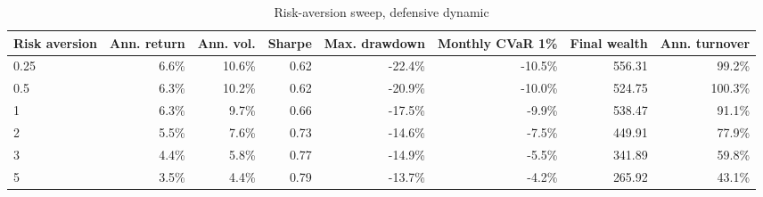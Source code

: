 ﻿\begin{table}[!htbp]
\centering
\caption{Risk-aversion sweep, defensive dynamic}
\label{tab:allocation-risk-aversion-defensive}
\small
\setlength{\tabcolsep}{5pt}
\renewcommand{\arraystretch}{1.12}
\begin{adjustbox}{center,max width=\linewidth}
\begin{tabular}{lrrrrrrr}
\toprule
Risk aversion & Ann. return & Ann. vol. & Sharpe & Max. drawdown & Monthly CVaR 1\% & Final wealth & Ann. turnover \\
\midrule
0.25 & 6.6\% & 10.6\% & 0.62 & -22.4\% & -10.5\% & 556.31 & 99.2\% \\
0.5 & 6.3\% & 10.2\% & 0.62 & -20.9\% & -10.0\% & 524.75 & 100.3\% \\
1 & 6.3\% & 9.7\% & 0.66 & -17.5\% & -9.9\% & 538.47 & 91.1\% \\
2 & 5.5\% & 7.6\% & 0.73 & -14.6\% & -7.5\% & 449.91 & 77.9\% \\
3 & 4.4\% & 5.8\% & 0.77 & -14.9\% & -5.5\% & 341.89 & 59.8\% \\
5 & 3.5\% & 4.4\% & 0.79 & -13.7\% & -4.2\% & 265.92 & 43.1\% \\
\bottomrule
\end{tabular}
\end{adjustbox}
\end{table}
